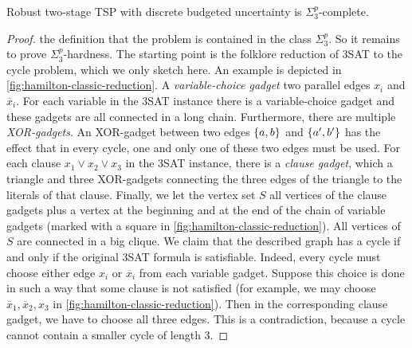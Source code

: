 \begin{theorem}
\label{thm:discr-two-stage-tsp}
Robust two-stage TSP with discrete budgeted uncertainty is $\Sigma_3^p$-complete.
\end{theorem}
\begin{proof}
 the definition that the problem is contained in the class $\Sigma_3^p$. So it remains to prove $\Sigma_3^p$-hardness.
The starting point is the folklore reduction of 3SAT to the  cycle problem, which we only sketch here. An example is depicted in \cref{fig:hamilton-classic-reduction}.
A \emph{variable-choice gadget}  two parallel edges $x_i$ and $\overline x_i$.
For each variable in the 3SAT instance there is a variable-choice gadget and these gadgets are all connected in a long chain. 
Furthermore, there are multiple \emph{XOR-gadgets}. An XOR-gadget between two edges $\{ a,b \}$ and $\{ a',b' \}$ has the effect that in every  cycle, one and only one of these two edges must be used.
For each clause $x_1 \lor x_2 \lor x_3$ in the 3SAT instance, there is a \emph{clause gadget}, which  a triangle and three XOR-gadgets connecting the three edges of the triangle to the literals of that clause.
Finally, we let the vertex set $S$  all vertices of the clause gadgets plus a vertex at the beginning and at the end of the chain of variable gadgets (marked with a square in \cref{fig:hamilton-classic-reduction}).
All vertices of $S$ are connected in a big clique.
We claim that the described graph has a  cycle if and only if the original 3SAT formula is satisfiable. Indeed, every  cycle must choose either edge $x_i$ or $\overline x_i$ from each variable gadget.
Suppose this choice is done in such a way that some clause is not satisfied (for example, we may choose $\overline x_1, \overline{x}_2, x_3$ in \cref{fig:hamilton-classic-reduction}). 
Then in the corresponding clause gadget, we have to choose all three edges. This is a contradiction, because a  cycle cannot contain a smaller cycle of length 3.
 

\end{proof}
